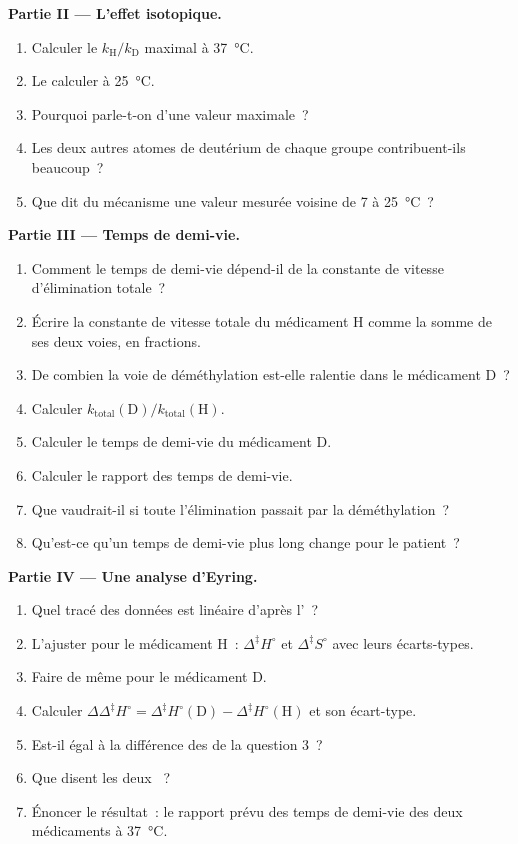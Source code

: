 \begin{problem}
\medskip\noindent\textbf{Partie II --- L'effet isotopique.}
\begin{enumerate}[resume]
  \item Calculer le $k_{\mathrm H}/k_{\mathrm D}$ maximal à
        \qty{37}{\celsius}.
  \item Le calculer à \qty{25}{\celsius}.
  \item Pourquoi parle-t-on d'une valeur maximale~?
  \item Les deux autres atomes de deutérium de chaque groupe 
        contribuent-ils beaucoup~?
  \item Que dit du mécanisme une valeur mesurée voisine de 7 à
        \qty{25}{\celsius}~?
\end{enumerate}

\medskip\noindent\textbf{Partie III --- Temps de demi-vie.}
\begin{enumerate}[resume]
  \item Comment le temps de demi-vie dépend-il de la constante de vitesse
        d'élimination totale~?
  \item Écrire la constante de vitesse totale du médicament H comme la
        somme de ses deux voies, en fractions.
  \item De combien la voie de déméthylation est-elle ralentie dans le
        médicament D~?
  \item Calculer $k_{\mathrm{total}}(\mathrm D)/k_{\mathrm{total}}(\mathrm H)$.
  \item Calculer le temps de demi-vie du médicament D.
  \item Calculer le rapport des temps de demi-vie.
  \item Que vaudrait-il si toute l'élimination passait par la
        déméthylation~?
  \item Qu'est-ce qu'un temps de demi-vie plus long change pour le
        patient~?
\end{enumerate}

\medskip\noindent\textbf{Partie IV --- Une analyse d'Eyring.}
\begin{enumerate}[resume]
  \item Quel tracé des données est linéaire d'après l'~?
  \item L'ajuster pour le médicament H~: $\Delta^{\ddagger}H^\circ$ et
        $\Delta^{\ddagger}S^\circ$ avec leurs écarts-types.
  \item Faire de même pour le médicament D.
  \item Calculer $\Delta\Delta^{\ddagger}H^\circ = \Delta^{\ddagger}H^\circ(\mathrm D) - \Delta^{\ddagger}H^\circ(\mathrm H)$
        et son écart-type.
  \item Est-il égal à la différence des  de la
        question 3~?
  \item Que disent les deux ~?
  \item Énoncer le résultat~: le rapport prévu des temps de demi-vie des
        deux médicaments à \qty{37}{\celsius}.
\end{enumerate}
\end{problem}
